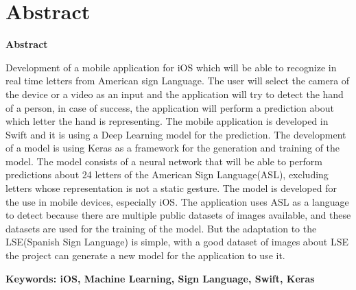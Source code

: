 \documentclass[../main.tex]{subfiles}
\begin{document}
\makeatletter
\renewenvironment{abstract}{%
    \if@twocolumn
      \section*{Abstract \\}%
    \else %
    \begin{flushright}
        {\filleft\Huge\bfseries\fontsize{48pt}{12}\selectfont Abstract\vspace{\z@}}%
        \end{flushright}
      \quotation
    \fi}
    {\if@twocolumn\else\endquotation\fi}
\makeatother
\begin{abstract}

Development of a mobile application for iOS which will be able to recognize in real time letters from American sign Language. The user will select the camera of the device or a video as an input and the application will try to detect the hand of a person, in case of success, the application will perform a prediction about which letter the hand is representing.
The mobile application is developed in Swift and it is using a Deep Learning model for the prediction. The development of a model is using Keras as a framework for the generation and training of the model. The model consists of a neural network that will be able to perform predictions about 24 letters of the American Sign Language(ASL), excluding letters whose representation is not a static gesture. The model is developed for the use in mobile devices, especially iOS.
The application uses ASL as a language to detect because there are multiple public datasets of images available, and these datasets are used for the training of the model. But the adaptation to the LSE(Spanish Sign Language) is simple, with a good dataset of images about LSE the project can generate a new model for the application to use it.


\bfseries{\large{Keywords:}} iOS, Machine Learning, Sign Language, Swift, Keras

\end{abstract}
\end{document}
